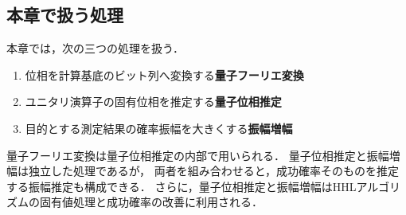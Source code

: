 \subsection{本章で扱う処理}
\label{subsec:subroutines-in-this-chapter}

本章では，次の三つの処理を扱う．

\begin{enumerate}[(1)]
  \item 位相を計算基底のビット列へ変換する\textbf{量子フーリエ変換}
  \item ユニタリ演算子の固有位相を推定する\textbf{量子位相推定}
  \item 目的とする測定結果の確率振幅を大きくする\textbf{振幅増幅}
\end{enumerate}

量子フーリエ変換は量子位相推定の内部で用いられる．
量子位相推定と振幅増幅は独立した処理であるが，
両者を組み合わせると，成功確率そのものを推定する振幅推定も構成できる．
さらに，量子位相推定と振幅増幅はHHLアルゴリズムの固有値処理と成功確率の改善に利用される．
